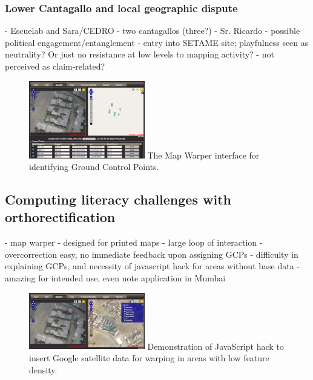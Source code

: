 \documentclass[11pt]{report}
\begin{document}
\subsubsection{Lower Cantagallo and local geographic dispute}
            - Escuelab and Sara/CEDRO
	- two cantagallos (three?)
            - Sr. Ricardo - possible political engagement/entanglement
            - entry into SETAME site; playfulness seen as neutrality? Or just no resistance at low levels to mapping activity?
                - not perceived as claim-related?

\begin{figure}
	\begin{flushright}
		\includegraphics[width=0.45\textwidth]{images/map-warper.png}
		The Map Warper interface for identifying Ground Control Points. \cite{waters2009warper}
	\end{flushright}
\end{figure}

\subsection{Computing literacy challenges with orthorectification}
	- map warper
        - designed for printed maps
        - large loop of interaction - overcorrection easy, no immediate feedback upon assigning GCPs
        - difficulty in explaining GCPs, and necessity of javascript hack for areas without base data
        - amazing for intended use, even note application in Mumbai

\begin{figure}
	\begin{flushright}
		\includegraphics[width=0.45\textwidth]{images/map-warper-hack.png}
		Demonstration of JavaScript hack to insert Google satellite data for warping in areas with low feature density. \cite{waters2009warper}
	\end{flushright}
\end{figure}
\end{document}
